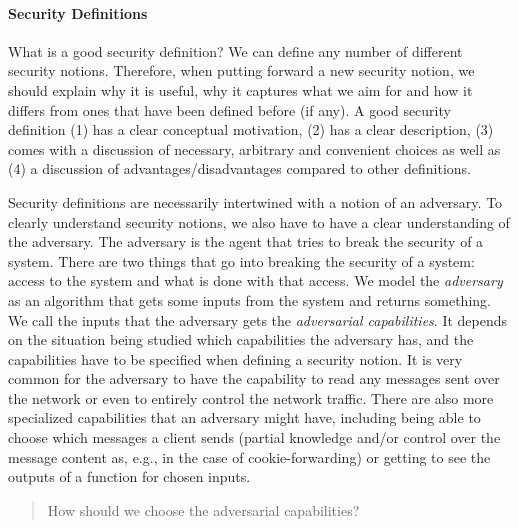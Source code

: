 \paragraph{Security Definitions} What is a good security definition? We can define any number of different security notions. Therefore, when putting forward a new security notion, we should explain why it is useful, why it captures what we aim for and how it differs from ones that have been defined before (if any). A good security definition (1) has a clear conceptual motivation, (2) has a clear description, (3) comes with a discussion of necessary, arbitrary and convenient choices as well as (4) a discussion of advantages/disadvantages compared to other definitions.

Security definitions are necessarily intertwined with a notion of an adversary. To clearly understand security notions, we also have to have a clear understanding of the adversary. The adversary is the agent that tries to break the security of a system. There are two things that go into breaking the security of a system: access to the system and what is done with that access. We model the \emph{adversary} as an algorithm that gets some inputs from the system and returns something. We call the inputs that the adversary gets the \emph{adversarial capabilities}.
It depends on the situation being studied which capabilities the adversary has, and the capabilities have to be specified when defining a security notion. It is very common for the adversary to have the capability to read any messages sent over the network or even to entirely control the network traffic. There are also more specialized capabilities that an adversary might have, including being able to choose which messages a client sends (partial knowledge and/or control over the message content as, e.g., in the case of cookie-forwarding) or getting to see the outputs of a function for chosen inputs.

\begin{quote}
    How should we choose the adversarial capabilities?
\end{quote}

